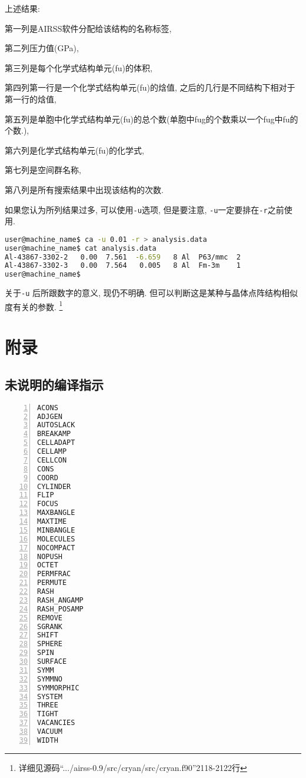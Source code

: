 \documentclass[a4paper, 10pt]{article}
\begin{document}
    上述结果:
    
    第一列是AIRSS软件分配给该结构的名称标签, 
    
    第二列压力值(GPa), 
    
    第三列是每个化学式结构单元(fu)的体积, 
    
    第四列第一行是一个化学式结构单元(fu)的焓值, 之后的几行是不同结构下相对于第一行的焓值,
    
    第五列是单胞中化学式结构单元(fu)的总个数(单胞中fug的个数乘以一个fug中fu的个数.), 
    
    第六列是化学式结构单元(fu)的化学式,
    
    第七列是空间群名称, 
    
    第八列是所有搜索结果中出现该结构的次数.


    如果您认为所列结果过多, 可以使用\verb|-u|选项, 但是要注意, \verb|-u|一定要排在\verb|-r|之前使用.
    \begin{lstlisting}[language={bash}]
user@machine_name$ ca -u 0.01 -r > analysis.data
user@machine_name$ cat analysis.data
Al-43867-3302-2   0.00  7.561  -6.659   8 Al  P63/mmc  2
Al-43867-3302-3   0.00  7.564   0.005   8 Al  Fm-3m    1
user@machine_name$
    \end{lstlisting}

    关于\verb|-u| 后所跟数字的意义, 现仍不明确. 但可以判断这是某种与晶体点阵结构相似度有关的参数. \footnote{详细见源码``.../airss-0.9/src/cryan/src/cryan.f90''2118-2122行}


  \section{附录}
    \subsection{未说明的编译指示}
    \label{Pragma_Unexplain}
    \begin{lstlisting}[language={bash},numbers=left]
ACONS
ADJGEN
AUTOSLACK
BREAKAMP
CELLADAPT
CELLAMP
CELLCON
CONS
COORD
CYLINDER
FLIP
FOCUS
MAXBANGLE
MAXTIME
MINBANGLE
MOLECULES
NOCOMPACT
NOPUSH
OCTET
PERMFRAC
PERMUTE
RASH
RASH_ANGAMP
RASH_POSAMP
REMOVE
SGRANK
SHIFT
SPHERE
SPIN
SURFACE
SYMM
SYMMNO
SYMMORPHIC
SYSTEM
THREE
TIGHT
VACANCIES
VACUUM
WIDTH
      \end{lstlisting}

  
\end{document}

